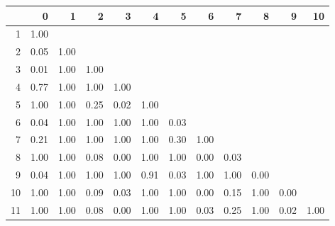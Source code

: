 % 
\begin{tabular}{rrrrrrrrrrrr}
  \hline
 & 0 & 1 & 2 & 3 & 4 & 5 & 6 & 7 & 8 & 9 & 10 \\ 
  \hline
1 & 1.00 &  &  &  &  &  &  &  &  &  &  \\ 
  2 & 0.05 & 1.00 &  &  &  &  &  &  &  &  &  \\ 
  3 & 0.01 & 1.00 & 1.00 &  &  &  &  &  &  &  &  \\ 
  4 & 0.77 & 1.00 & 1.00 & 1.00 &  &  &  &  &  &  &  \\ 
  5 & 1.00 & 1.00 & 0.25 & 0.02 & 1.00 &  &  &  &  &  &  \\ 
  6 & 0.04 & 1.00 & 1.00 & 1.00 & 1.00 & 0.03 &  &  &  &  &  \\ 
  7 & 0.21 & 1.00 & 1.00 & 1.00 & 1.00 & 0.30 & 1.00 &  &  &  &  \\ 
  8 & 1.00 & 1.00 & 0.08 & 0.00 & 1.00 & 1.00 & 0.00 & 0.03 &  &  &  \\ 
  9 & 0.04 & 1.00 & 1.00 & 1.00 & 0.91 & 0.03 & 1.00 & 1.00 & 0.00 &  &  \\ 
  10 & 1.00 & 1.00 & 0.09 & 0.03 & 1.00 & 1.00 & 0.00 & 0.15 & 1.00 & 0.00 &  \\ 
  11 & 1.00 & 1.00 & 0.08 & 0.00 & 1.00 & 1.00 & 0.03 & 0.25 & 1.00 & 0.02 & 1.00 \\ 
   \hline
\end{tabular}
% 
